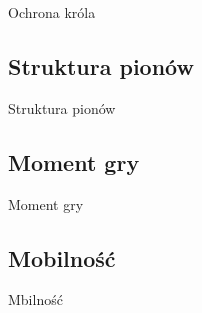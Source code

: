 Ochrona króla

\subsection{Struktura pionów}
\label{subsec:struktura-pionow}

Struktura pionów

\subsection{Moment gry}
\label{subsec:moment-gry}

Moment gry

\subsection{Mobilność}
\label{subsec:mobilnosc}

Mbilność
